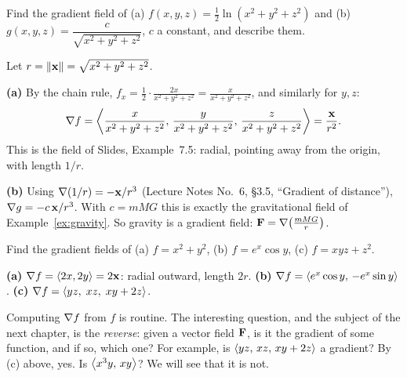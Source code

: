 \begin{example}\label{ex:gradfield3}
Find the gradient field of (a) $f(x,y,z)=\frac12\ln(x^2+y^2+z^2)$ and
(b) $g(x,y,z)=\dfrac{c}{\sqrt{x^2+y^2+z^2}}$, $c$ a constant, and describe them.
\end{example}
\begin{solution}
Let $r=\lVert\mathbf{x}\rVert=\sqrt{x^2+y^2+z^2}$.

\textbf{(a)} By the chain rule,
$f_x=\frac12\cdot\frac{2x}{x^2+y^2+z^2}=\frac{x}{x^2+y^2+z^2}$, and similarly for $y,z$:
\[
  \nabla f=\left\langle \frac{x}{x^2+y^2+z^2},\,\frac{y}{x^2+y^2+z^2},\,\frac{z}{x^2+y^2+z^2} \right\rangle=\frac{\mathbf{x}}{r^2}.
\]
This is the field of Slides, Example~7.5: radial, pointing away from the
origin, with length $1/r$.

\textbf{(b)} Using $\nabla(1/r)=-\mathbf{x}/r^3$ (Lecture Notes No.~6, \S3.5, ``Gradient of
distance''), $\nabla g=-c\,\mathbf{x}/r^3$. With $c=mMG$ this is exactly the
gravitational field of Example~\ref{ex:gravity}. So gravity is a gradient field:
$\mathbf{F}=\nabla\!\left(\frac{mMG}{r}\right)$.
\end{solution}

\begin{example}\label{ex:gradfield-more}
Find the gradient fields of (a) $f=x^2+y^2$, (b) $f=e^x\cos y$,
(c) $f=xyz+z^2$.
\end{example}
\begin{solution}
\textbf{(a)} $\nabla f=\left\langle 2x,2y \right\rangle=2\mathbf{x}$: radial outward, length $2r$.
\textbf{(b)} $\nabla f=\left\langle e^x\cos y,\,-e^x\sin y \right\rangle$.
\textbf{(c)} $\nabla f=\left\langle yz,\;xz,\;xy+2z \right\rangle$.
\end{solution}

\begin{remark}
Computing $\nabla f$ from $f$ is routine. The interesting question, and the
subject of the next chapter, is the \emph{reverse}: given a vector field $\mathbf{F}$,
is it the gradient of some function, and if so, which one? For example, is
$\left\langle yz,\,xz,\,xy+2z \right\rangle$ a gradient? By (c) above, yes. Is $\left\langle x^3y,\,xy \right\rangle$? We
will see that it is not.
\end{remark}
